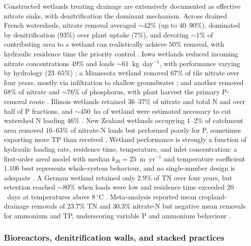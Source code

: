 \documentclass[11pt]{article}
\begin{document}
Constructed wetlands treating drainage are extensively documented as
effective nitrate sinks, with denitrification the dominant mechanism.
Across drained French watersheds, nitrate removal averaged $\sim42\%$ (up
to $40$--$90\%$), dominated by denitrification ($93\%$) over plant uptake
($7\%$), and devoting $\sim1\%$ of contributing area to a wetland can
realistically achieve $50\%$ removal, with hydraulic residence time the
priority control \parencite{Tournebize2017}. Iowa wetlands reduced incoming
nitrate concentrations $49\%$ and loads $\sim61$~kg~day$^{-1}$, with
performance varying by hydrology ($23$--$65\%$) \parencite{Drake2018}; a
Minnesota wetland removed $67\%$ of tile nitrate over four years, mostly
via infiltration to shallow groundwater \parencite{Gordon2021}; and another
removed $68\%$ of nitrate and $\sim76\%$ of phosphorus, with plant harvest
the primary P-removal route \parencite{Lenhart2016}. Illinois wetlands
retained $36$--$37\%$ of nitrate and total N and over half of P fractions,
and $\sim450$~ha of wetland were estimated necessary to cut watershed N
loading $46\%$ \parencite{Kovacic2006}. New Zealand wetlands occupying
$1$--$2\%$ of catchment area removed $16$--$63\%$ of nitrate-N loads but
performed poorly for P, sometimes exporting more TP than received
\parencite{Tanner2005,Tanner2005b,Tanner2011,Tanner2003}. Wetland
performance is strongly a function of hydraulic loading rate, residence
time, temperature, and inlet concentration: a first-order areal model with
median $k_{20}=25$~m~yr$^{-1}$ and temperature coefficient $1.106$ best
represents whole-system behaviour, and no single-number design is adequate
\parencite{Kadlec2012,Kalcic2018}. A German wetland retained only $2.9\%$
of TN over four years, but retention reached $\sim80\%$ when loads were low
and residence time exceeded $20$~days at temperatures above $8\,^{\circ}$C
\parencite{Steidl2019}. Meta-analysis reported mean cropland-drainage
removals of $23.7\%$ TN and $30.3\%$ nitrate-N but negative mean removals
for ammonium and TP, underscoring variable P and ammonium behaviour
\parencite{Messer2021}.

\subsubsection{Bioreactors, denitrification walls, and stacked practices}
\end{document}
